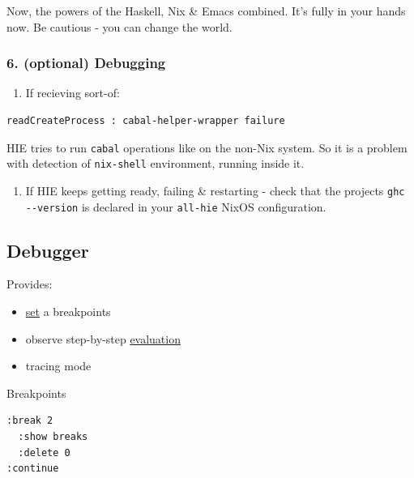 \documentclass[11pt]{article}
\begin{document}
Now, the powers of the Haskell, Nix \& Emacs combined. It's fully in your hands now. Be cautious - you can change the world.\\

\subsubsection{6. (optional) Debugging}
\label{sec:orgf084d7a}

\begin{enumerate}
\item If recieving sort-of:\\
\end{enumerate}

\begin{verbatim}
readCreateProcess : cabal-helper-wrapper failure
\end{verbatim}

HIE tries to run \texttt{cabal} operations like on the non-Nix system. So it is a problem with detection of \texttt{nix-shell} environment, running inside it.\\

\begin{enumerate}
\item If HIE keeps getting ready, failing \& restarting - check that the projects \texttt{ghc -{}-version} is declared in your \texttt{all-hie} NixOS configuration.\\
\end{enumerate}

\subsection{Debugger}
\label{sec:org9d21579}

Provides:\\
\begin{itemize}
\item \hyperref[orgbed80ba]{set} a breakpoints\\
\item observe step-by-step \hyperref[org5445907]{evaluation}\\
\item tracing mode\\
\end{itemize}

Breakpoints\\
\begin{verbatim}
:break 2
  :show breaks
  :delete 0
:continue
\end{verbatim}
\end{document}
